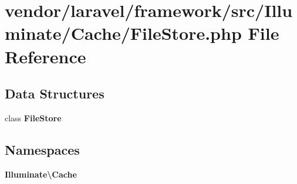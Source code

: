 \section{vendor/laravel/framework/src/\+Illuminate/\+Cache/\+File\+Store.php File Reference}
\label{_file_store_8php}
\subsection*{Data Structures}
\begin{DoxyCompactItemize}
\item 
class {\bf File\+Store}
\end{DoxyCompactItemize}
\subsection*{Namespaces}
\begin{DoxyCompactItemize}
\item 
 {\bf Illuminate\textbackslash{}\+Cache}
\end{DoxyCompactItemize}
